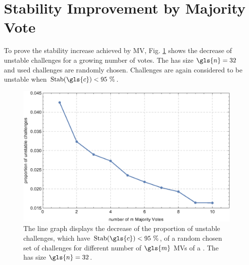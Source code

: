 
\section{Stability Improvement by Majority Vote}
\label{sec:stabilityimprovementbymajorityvote}

To prove the stability increase achieved by \ac{MV}, Fig. \ref{fig:majorityvotestabilityimprovement} shows the decrease of unstable challenges for a growing number of votes.
The \mpuf has size $\gls{n} = 32$ and used challenges are randomly chosen.
Challenges are again considered to be unstable when $\Stab(\gls{c}) < 95\ \%$.

\begin{figure}[ht]
\includegraphics[width=1.00\textwidth]{images/single-votes-stab-simulation.eps}
\caption[Decrease of unstable challenges of a \mpuf]{The line graph displays the decrease of the proportion of unstable challenges, which have $\Stab(\gls{c}) < 95\ \%$, of a random chosen set of challenges for different number of $\gls{m}$ \acp{MV} of a \mpuf.
The \mpuf has size $\gls{n} = 32$.
} %
\label{fig:majorityvotestabilityimprovement}
\end{figure}

